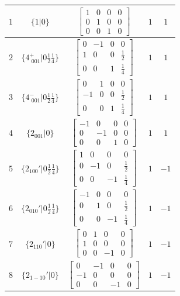 \documentclass[fleqn,8pt]{jsarticle}
\begin{document}
\begin{longtable}{ccccc}
$ 1 $ & $ \{1|0\} $ & $ \begin{bmatrix} 1 & 0 & 0 & 0 \\ 0 & 1 & 0 & 0 \\ 0 & 0 & 1 & 0 \end{bmatrix} $ & $ 1 $ & $ 1 $ \\ \hline
$ 2 $ & $ \{4^{+}_{\,\,001}|0 \frac{1}{2} \frac{1}{4}\} $ & $ \begin{bmatrix} 0 & -1 & 0 & 0 \\ 1 & 0 & 0 & \frac{1}{2} \\ 0 & 0 & 1 & \frac{1}{4} \end{bmatrix} $ & $ 1 $ & $ 1 $ \\ \hline
$ 3 $ & $ \{4^{-}_{\,\,001}|0 \frac{1}{2} \frac{1}{4}\} $ & $ \begin{bmatrix} 0 & 1 & 0 & 0 \\ -1 & 0 & 0 & \frac{1}{2} \\ 0 & 0 & 1 & \frac{1}{4} \end{bmatrix} $ & $ 1 $ & $ 1 $ \\ \hline
$ 4 $ & $ \{2{}_{001}|0\} $ & $ \begin{bmatrix} -1 & 0 & 0 & 0 \\ 0 & -1 & 0 & 0 \\ 0 & 0 & 1 & 0 \end{bmatrix} $ & $ 1 $ & $ 1 $ \\ \hline
$ 5 $ & $ \{2{}_{100}{}'|0 \frac{1}{2} \frac{1}{4}\} $ & $ \begin{bmatrix} 1 & 0 & 0 & 0 \\ 0 & -1 & 0 & \frac{1}{2} \\ 0 & 0 & -1 & \frac{1}{4} \end{bmatrix} $ & $ 1 $ & $ -1 $ \\ \hline
$ 6 $ & $ \{2{}_{010}{}'|0 \frac{1}{2} \frac{1}{4}\} $ & $ \begin{bmatrix} -1 & 0 & 0 & 0 \\ 0 & 1 & 0 & \frac{1}{2} \\ 0 & 0 & -1 & \frac{1}{4} \end{bmatrix} $ & $ 1 $ & $ -1 $ \\ \hline
$ 7 $ & $ \{2{}_{110}{}'|0\} $ & $ \begin{bmatrix} 0 & 1 & 0 & 0 \\ 1 & 0 & 0 & 0 \\ 0 & 0 & -1 & 0 \end{bmatrix} $ & $ 1 $ & $ -1 $ \\ \hline
$ 8 $ & $ \{2{}_{1-10}{}'|0\} $ & $ \begin{bmatrix} 0 & -1 & 0 & 0 \\ -1 & 0 & 0 & 0 \\ 0 & 0 & -1 & 0 \end{bmatrix} $ & $ 1 $ & $ -1 $ \\ \hline

\end{longtable}
\end{document}

